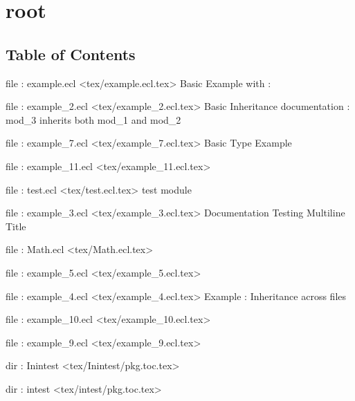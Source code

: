 \chapter*{root}


\section*{Table of Contents}
\par
file : example.ecl <tex/example.ecl.tex>  Basic Example with :

\par
file : example\_2.ecl <tex/example\_2.ecl.tex>  Basic Inheritance documentation : mod\_3 inherits both mod\_1 and mod\_2

\par
file : example\_7.ecl <tex/example\_7.ecl.tex>  Basic Type Example

\par
file : example\_11.ecl <tex/example\_11.ecl.tex>  

\par
file : test.ecl <tex/test.ecl.tex>  test module

\par
file : example\_3.ecl <tex/example\_3.ecl.tex>  Documentation Testing Multiline Title

\par
file : Math.ecl <tex/Math.ecl.tex>  

\par
file : example\_5.ecl <tex/example\_5.ecl.tex>  

\par
file : example\_4.ecl <tex/example\_4.ecl.tex>  Example : Inheritance across files

\par
file : example\_10.ecl <tex/example\_10.ecl.tex>  

\par
file : example\_9.ecl <tex/example\_9.ecl.tex>  

\par
dir : Inintest <tex/Inintest/pkg.toc.tex>  

\par
dir : intest <tex/intest/pkg.toc.tex>  















